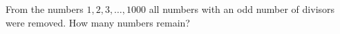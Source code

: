 From the numbers $1, 2, 3, \ldots, 1000$ all numbers with an odd number of divisors were removed. How many numbers remain?
